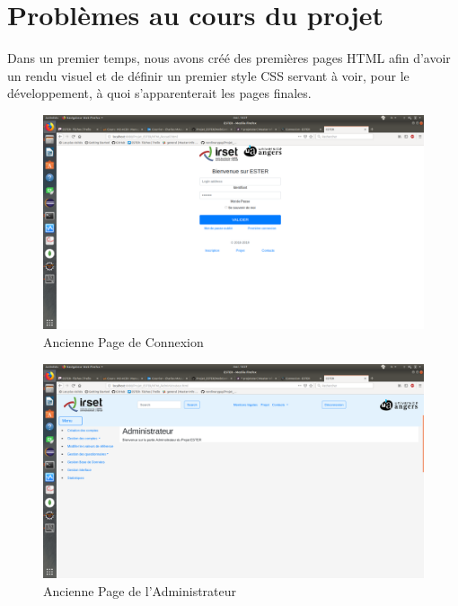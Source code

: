 \section{Problèmes au cours du projet}

Dans un premier temps, nous avons créé des premières pages HTML afin d'avoir un rendu visuel et de définir un premier style CSS servant à voir, pour le développement, à quoi s'apparenterait les pages finales.

\begin{figure}[H]
    \begin{center}
	\includegraphics[scale=0.2,trim=4cm 0cm 4cm 5.3cm, clip=true]{img/OldConnexion}
    \end{center}
    \caption{Ancienne Page de Connexion}
\end{figure}

\begin{figure}[H]
    \begin{center}
	\includegraphics[scale=0.2,trim=2.8cm 0cm 0.8cm 5.3cm, clip=true]{img/OldAdmin}
    \end{center}
    \caption{Ancienne Page de l'Administrateur}
\end{figure}

